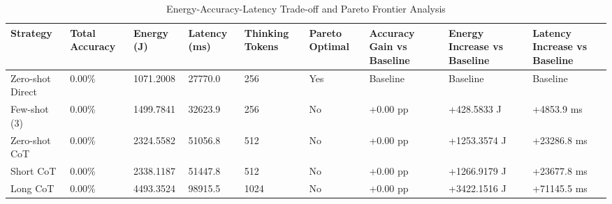 \begin{table}
\caption{Energy-Accuracy-Latency Trade-off and Pareto Frontier Analysis}
\label{tab:tradeoff_comparison}
\begin{tabular}{lllllllll}
\toprule
Strategy & Total Accuracy & Energy (J) & Latency (ms) & Thinking Tokens & Pareto Optimal & Accuracy Gain vs Baseline & Energy Increase vs Baseline & Latency Increase vs Baseline \\
\midrule
Zero-shot Direct & 0.00\% & 1071.2008 & 27770.0 & 256 & Yes & Baseline & Baseline & Baseline \\
Few-shot (3) & 0.00\% & 1499.7841 & 32623.9 & 256 & No & +0.00 pp & +428.5833 J & +4853.9 ms \\
Zero-shot CoT & 0.00\% & 2324.5582 & 51056.8 & 512 & No & +0.00 pp & +1253.3574 J & +23286.8 ms \\
Short CoT & 0.00\% & 2338.1187 & 51447.8 & 512 & No & +0.00 pp & +1266.9179 J & +23677.8 ms \\
Long CoT & 0.00\% & 4493.3524 & 98915.5 & 1024 & No & +0.00 pp & +3422.1516 J & +71145.5 ms \\
\bottomrule
\end{tabular}
\end{table}
